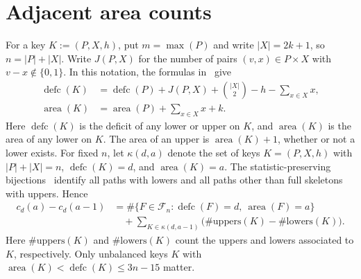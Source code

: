 \documentclass[11pt]{article}
\DeclareMathOperator{\area}{area}\DeclareMathOperator{\dinv}{dinv}
\DeclareMathOperator{\defc}{defc}\DeclareMathOperator{\sym}{sym}
\begin{document}
\section{Adjacent area counts}
For a key $K:=(P,X,h)$, put $m=\max(P)$ and write $|X|=2k+1$, so $n=|P|+|X|$. Write $J(P,X)$ for the number of pairs $(v,x)\in P\times X$ with $v-x\notin\{0,1\}$. In this notation, the formulas in~\cite[\S2]{H} give
\begin{equation}\label{stats}
 \begin{aligned}
 \defc(K)&=\defc(P)+J(P,X)+\binom{|X|}{2}-h-\sum_{x\in X}x,\\
 \area(K)&=\area(P)+\sum_{x\in X}x+k.
 \end{aligned}
\end{equation}
Here $\defc(K)$ is the deficit of any lower or upper on $K$, and $\area(K)$ is the area of any lower on $K$. The area of an upper is $\area(K)+1$, whether or not a lower exists. For fixed $n$, let $\kappa(d,a)$ denote the set of keys $K=(P,X,h)$ with $|P|+|X|=n$, $\defc(K)=d$, and $\area(K)=a$. The statistic-preserving bijections~\cite[\S1.2]{H} identify all paths with lowers and all paths other than full skeletons with uppers. Hence
\begin{equation}\label{diff}
 \begin{aligned}
 c_d(a)-c_d(a-1)&=\#\{F\in\mathcal F_n:\defc(F)=d,\ \area(F)=a\}\\
 &\quad+\sum_{K\in\kappa(d,a-1)}\bigl(\#\mathrm{uppers}(K)-\#\mathrm{lowers}(K)\bigr).
 \end{aligned}
\end{equation}
Here $\#\mathrm{uppers}(K)$ and $\#\mathrm{lowers}(K)$ count the uppers and lowers associated to $K$, respectively. Only unbalanced keys $K$ with $\area(K)<\defc(K)\le3n-15$ matter.
\end{document}
